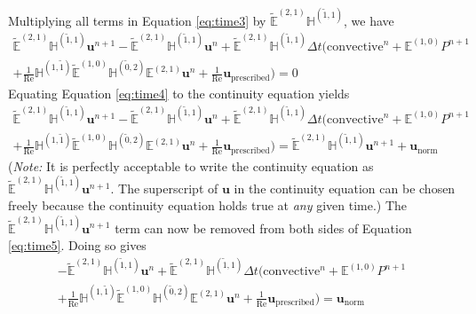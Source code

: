 Multiplying all terms in Equation \eqref{eq:time3} by $\tilde{\mathbb{E}}^{(2,1)} \mathbb{H}^{(\tilde{1},1)}$, we have
\begin{multline}
    \label{eq:time4}
    \tilde{\mathbb{E}}^{(2,1)} \mathbb{H}^{(\tilde{1},1)} \mathbf{u}^{n+1} - \tilde{\mathbb{E}}^{(2,1)} \mathbb{H}^{(\tilde{1},1)} \mathbf{u}^{n} + \tilde{\mathbb{E}}^{(2,1)} \mathbb{H}^{(\tilde{1},1)} \Delta t \biggl( \text{convective}^{n} + \mathbb{E}^{(1,0)} P^{n+1} \\
    + \frac{1}{\text{Re}} \mathbb{H}^{(1,\tilde{1})} \tilde{\mathbb{E}}^{(1,0)} \mathbb{H}^{(\tilde{0},2)} \mathbb{E}^{(2,1)} \mathbf{u}^{n} + \frac{1}{\text{Re}} \mathbf{u}_{\text{prescribed}} \biggr) = 0
\end{multline}
Equating Equation \eqref{eq:time4} to the continuity equation yields
\begin{multline}
    \label{eq:time5}
    \tilde{\mathbb{E}}^{(2,1)} \mathbb{H}^{(\tilde{1},1)} \mathbf{u}^{n+1} - \tilde{\mathbb{E}}^{(2,1)} \mathbb{H}^{(\tilde{1},1)} \mathbf{u}^{n} +  \tilde{\mathbb{E}}^{(2,1)} \mathbb{H}^{(\tilde{1},1)} \Delta t \biggl( \text{convective}^{n} + \mathbb{E}^{(1,0)} P^{n+1} \\
    + \frac{1}{\text{Re}} \mathbb{H}^{(1,\tilde{1})} \tilde{\mathbb{E}}^{(1,0)} \mathbb{H}^{(\tilde{0},2)} \mathbb{E}^{(2,1)} \mathbf{u}^{n} + \frac{1}{\text{Re}} \mathbf{u}_{\text{prescribed}} \biggr) = \tilde{\mathbb{E}}^{(2,1)} \mathbb{H}^{(\tilde{1},1)} \mathbf{u}^{n+1} + \mathbf{u}^{}_{\text{norm}}
\end{multline}
(\textit{Note:} It is perfectly acceptable to write the continuity equation as $\tilde{\mathbb{E}}^{(2,1)} \mathbb{H}^{(\tilde{1},1)} \mathbf{u}^{n+1}$. The superscript of $\mathbf{u}$ in the continuity equation can be chosen freely because the continuity equation holds true at \emph{any} given time.) The $\tilde{\mathbb{E}}^{(2,1)} \mathbb{H}^{(\tilde{1},1)} \mathbf{u}^{n+1}$ term can now be removed from both sides of Equation \eqref{eq:time5}. Doing so gives
\begin{multline}
    \label{eq:time6}
    - \tilde{\mathbb{E}}^{(2,1)} \mathbb{H}^{(\tilde{1},1)} \mathbf{u}^{n} +
    \tilde{\mathbb{E}}^{(2,1)} \mathbb{H}^{(\tilde{1},1)} \Delta t \biggl( \text{convective}^{n} + \mathbb{E}^{(1,0)} P^{n+1} \\
    + \frac{1}{\text{Re}} \mathbb{H}^{(1,\tilde{1})} \tilde{\mathbb{E}}^{(1,0)} \mathbb{H}^{(\tilde{0},2)} \mathbb{E}^{(2,1)} \mathbf{u}^{n} + \frac{1}{\text{Re}} \mathbf{u}_{\text{prescribed}} \biggr) = \mathbf{u}^{}_{\text{norm}}
\end{multline}
